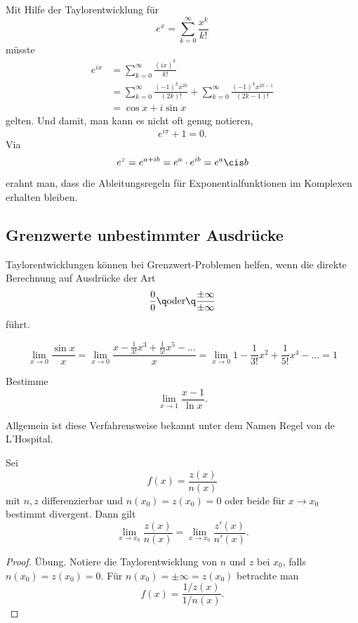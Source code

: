 \documentclass[%
11pt,%
twoside,%
titlepage,%
german,%
headsepline%
]{scrartcl}
\begin{document}
Mit Hilfe der Taylorentwicklung f\"ur
$$e^x=\sum_{k=0}^\infty\frac{x^k}{k!}$$
m\"usste
\begin{align*}
e^{ix}&=\sum_{k=0}^\infty\frac{(ix)^k}{k!}\\
&=\sum_{k=0}^\infty\frac{(-1)^kx^{2k}}{(2k)!}+\sum_{k=0}^\infty\frac{(-1)^kx^{2k-1}}{(2k-1)!}\\
&=\cos x+i\sin x
\end{align*}
gelten. Und damit, man kann es nicht oft genug notieren,
$$e^{i\pi}+1=0.$$
Via
$$e^z=e^{a+ib}=e^a\cdot e^{ib}=e^a\cis b$$
erahnt man, dass die Ableitungsregeln f\"ur Exponentialfunktionen im Komplexen erhalten bleiben.

\subsection{Grenzwerte unbestimmter Ausdr\"ucke}

Taylorentwicklungen k\"onnen bei Grenzwert-Problemen helfen, wenn die direkte Berechnung auf Ausdr\"ucke der Art
$$\frac{0}{0}\q\text{oder}\q \frac{\pm\infty}{\pm\infty}$$
f\"uhrt.

\begin{bsp}
$$
\lim_{x\to0}\frac{\sin x}{x}=\lim_{x\to0}\frac{x-\frac{1}{3!}x^3+\frac{1}{5!}x^5-\dots}{x}=\lim_{x\to0}1-\frac{1}{3!}x^2+\frac{1}{5!}x^4-\dots=1
$$
\end{bsp}

\begin{ueb}
Bestimme
$$\lim_{x\to1}\frac{x-1}{\ln x}.$$
\end{ueb}

\noindent Allgemein ist diese Verfahrensweise bekannt unter dem Namen \glqq Regel von de L'Hospital\grqq.

\begin{satz}
Sei
$$f(x)=\frac{z(x)}{n(x)}$$
mit $n,z$ differenzierbar und $n(x_0)=z(x_0)=0$ oder beide f\"ur $x\to x_0$ bestimmt divergent. Dann gilt
$$\lim_{x\to x_0}\frac{z(x)}{n(x)}=\lim_{x\to x_0}\frac{z'(x)}{n'(x)}.$$
\end{satz}

\begin{proof}
\"Ubung. Notiere die Taylorentwicklung von $n$ und $z$ bei $x_0$, falls $n(x_0)=z(x_0)=0$. F\"ur $n(x_0)=\pm\infty=z(x_0)$ betrachte man
$$f(x)=\frac{1/z(x)}{1/n(x)}.$$
\end{proof}
\end{document}
